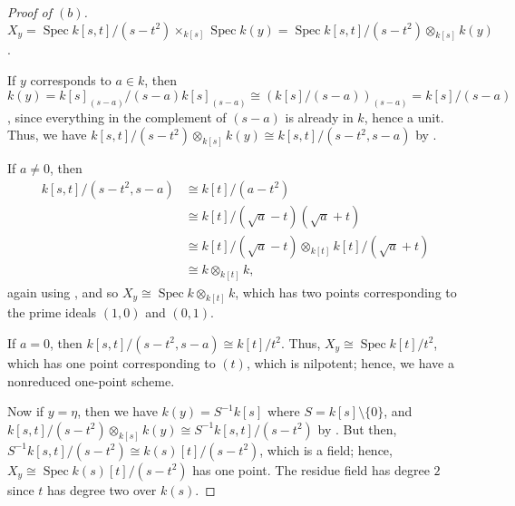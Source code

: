 \documentclass[10pt]{article}
\theoremstyle{definition}
\theoremstyle{remark}
\numberwithin{equation}{section}
\numberwithin{figure}{subsubsection}
\DeclareMathOperator{\Spec}{Spec}
\begin{document}
\begin{proof}[Proof of $(b)$]
  $X_y = \Spec k[s,t]/(s-t^2) \times_{k[s]} \Spec k(y) = \Spec k[s,t]/(s-t^2) \otimes_{k[s]} k(y)$.
  \par If $y$ corresponds to $a \in k$, then $k(y) =
  k[s]_{(s-a)}/(s-a)k[s]_{(s-a)} \cong (k[s]/(s-a))_{(s-a)} = k[s]/(s-a)$, since
  everything in the complement of $(s-a)$ is already in $k$, hence a unit. Thus,
  we have $k[s,t]/(s-t^2) \otimes_{k[s]} k(y) \cong k[s,t]/(s-t^2,s-a)$ by
  \cite[Exc.\ 2.2]{AM69}.
  \par If $a \ne 0$, then
  \begin{align*}
    k[s,t]/(s-t^2,s-a) &\cong k[t]/(a-t^2)\\
    &\cong k[t]/(\sqrt{a}-t)(\sqrt{a}+t)\\
    &\cong k[t]/(\sqrt{a}-t) \otimes_{k[t]} k[t]/(\sqrt{a}+t)\\
    &\cong k \otimes_{k[t]} k,
  \end{align*}
  again using \cite[Exc.\ 2.2]{AM69}, and so $X_y \cong \Spec k \otimes_{k[t]} k$, which has two points corresponding to the prime ideals $(1,0)$ and $(0,1)$.
  \par If $a = 0$, then $k[s,t]/(s-t^2,s-a) \cong k[t]/t^2$. Thus, $X_y \cong \Spec k[t]/t^2$, which has one point corresponding to $(t)$, which is nilpotent; hence, we have a nonreduced one-point scheme.
  \par Now if $y = \eta$, then we have $k(y) = S^{-1}k[s]$ where $S = k[s] \setminus \{0\}$, and $k[s,t]/(s-t^2) \otimes_{k[s]} k(y) \cong S^{-1}k[s,t]/(s-t^2)$ by \cite[Prop.~3.5]{AM69}. But then, $S^{-1}k[s,t]/(s-t^2) \cong k(s)[t]/(s-t^2)$, which is a field; hence, $X_y \cong \Spec k(s)[t]/(s-t^2)$ has one point. The residue field has degree $2$ since $t$ has degree two over $k(s)$.
\end{proof}
\end{document}
